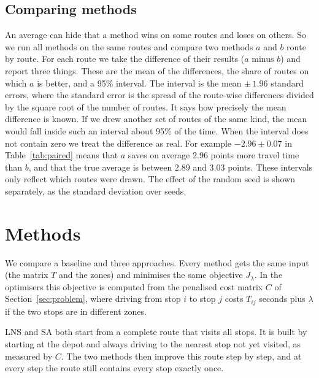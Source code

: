 \documentclass[11pt,a4paper]{article}
\newcommand{\Jl}{J_\lambda}
\begin{document}
\subsection{Comparing methods}
An average can hide that a method wins on some routes and loses on others. So we run all methods on the same routes and compare two methods $a$ and $b$ route by route. For each route we take the difference of their results ($a$ minus $b$) and report three things. These are the mean of the differences, the share of routes on which $a$ is better, and a 95\% interval. The interval is the mean $\pm\,1.96$ standard errors, where the standard error is the spread of the route-wise differences divided by the square root of the number of routes. It says how precisely the mean difference is known. If we drew another set of routes of the same kind, the mean would fall inside such an interval about 95\% of the time. When the interval does not contain zero we treat the difference as real. For example $-2.96\pm0.07$ in Table~\ref{tab:paired} means that $a$ saves on average 2.96 points more travel time than $b$, and that the true average is between 2.89 and 3.03 points. These intervals only reflect which routes were drawn. The effect of the random seed is shown separately, as the standard deviation over seeds.

\section{Methods}\label{sec:methods}
We compare a baseline and three approaches. Every method gets the same input (the matrix $T$ and the zones) and minimises the same objective $\Jl$. In the optimisers this objective is computed from the penalised cost matrix $C$ of Section~\ref{sec:problem}, where driving from stop $i$ to stop $j$ costs $T_{ij}$ seconds plus $\lambda$ if the two stops are in different zones.

LNS and SA both start from a complete route that visits all stops. It is built by starting at the depot and always driving to the nearest stop not yet visited, as measured by $C$. The two methods then improve this route step by step, and at every step the route still contains every stop exactly once.
\end{document}
